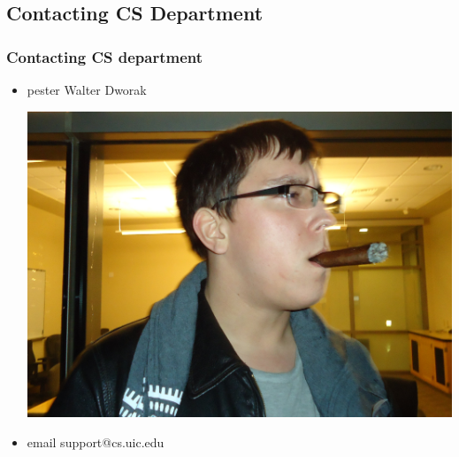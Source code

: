\documentclass[hyperref={pdfpagelabels=false}]{beamer}
\begin{document}
\subsection{Contacting CS Department}
\frame
{
    \frametitle{Contacting CS department}
    \begin{itemize}
    \item{pester Walter Dworak}

    \includegraphics[totalheight=0.3\textheight]{wdwora2.jpg}
    \item{email support@cs.uic.edu}
    \end{itemize}
}
\end{document}
